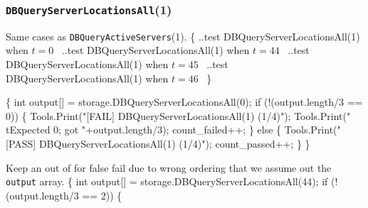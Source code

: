 \documentclass{article}
\def\nwendcode{\endtrivlist \endgroup}
\let\nwdocspar=\par
\begin{document}
\subsubsection{{\tt{}DBQueryServerLocationsAll}(1)}
Same cases as {\tt{}DBQueryActiveServers}(1).
\nwenddocs{}\endmoddef{}
\{
  \LA{}..test \code{}DBQueryServerLocationsAll\edoc{}(1) when $t=0$~{\nwtagstyle{}}\RA{}
  \LA{}..test \code{}DBQueryServerLocationsAll\edoc{}(1) when $t=44$~{\nwtagstyle{}}\RA{}
  \LA{}..test \code{}DBQueryServerLocationsAll\edoc{}(1) when $t=45$~{\nwtagstyle{}}\RA{}
  \LA{}..test \code{}DBQueryServerLocationsAll\edoc{}(1) when $t=46$~{\nwtagstyle{}}\RA{}
\}
\nwendcode{}\nwdocspar
\nwenddocs{}\endmoddef{}
\{
  int output[] = storage.DBQueryServerLocationsAll(0);
  if (!(output.length/3 == 0)) \{
    Tools.Print("[FAIL] DBQueryServerLocationsAll(1) (1/4)");
    Tools.Print("\\tExpected 0; got "+output.length/3);
    count_failed++;
  \} else \{
    Tools.Print("[PASS] DBQueryServerLocationsAll(1) (1/4)");
    count_passed++;
  \}
\}
\nwendcode{}\nwdocspar
Keep an out of for false fail due to wrong ordering that we assume out
the {\tt{}output} array.
\nwenddocs{}\endmoddef{}
\{
  int output[] = storage.DBQueryServerLocationsAll(44);
  if (!(output.length/3 == 2)) \{
\end{document}
